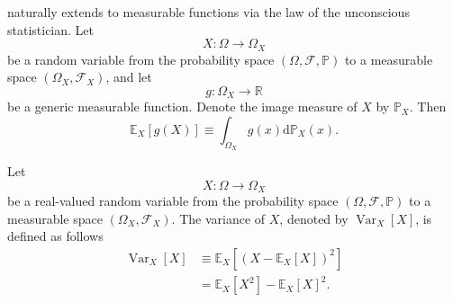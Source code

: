 \newpage
\begin{remark}
	\label{th:lotus}
	 naturally extends to measurable functions via the law of the unconscious statistician. Let 
	\begin{equation}
		X\colon \Omega \to \Omega_X
	\end{equation}
	be a random variable from the probability space $(\Omega, \mathcal{F}, \mathbb{P})$ to a measurable space $(\Omega_X, \mathcal{F}_X)$, and let 
	\begin{equation}
		g\colon \Omega_X \to \mathbb{R}
	\end{equation} 
	be a generic measurable function. Denote the image measure of $X$ by $\mathbb{P}_X $. Then
	\begin{equation}
		\mathbb{E}_X[g(X)] \equiv \int_{\Omega_X} g(x)\mathrm{d}\mathbb{P}_X(x).
		\label{eq:lotus_image}
	\end{equation}
\end{remark}

\begin{definition}[Variance]
	\label{def:variance}
	Let 
	\begin{equation}
		X\colon \Omega \to \Omega_X
	\end{equation}
	be a real-valued random variable from the probability space $(\Omega, \mathcal{F}, \mathbb{P})$ to a measurable space $(\Omega_X, \mathcal{F}_X)$. The variance of $X$, denoted by $\operatorname{Var}_X[X]$, is defined as follows
	\begin{equation}
		\begin{split}
			\operatorname{Var}_X[X]&\equiv \mathbb{E}_X[(X-\mathbb{E}_X[X])^2]\\
			&= \mathbb{E}_X[X^2]-\mathbb{E}_X[X]^2.
		\end{split}
	\end{equation}
\end{definition}

